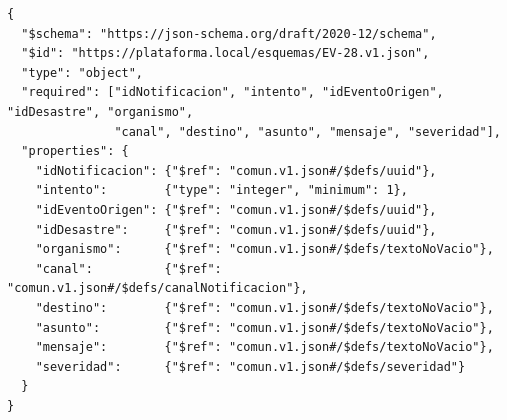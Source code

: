 \documentclass[11pt,letterpaper]{article}
\begin{document}
\begingroup\footnotesize
\begin{verbatim}
{
  "$schema": "https://json-schema.org/draft/2020-12/schema",
  "$id": "https://plataforma.local/esquemas/EV-28.v1.json",
  "type": "object",
  "required": ["idNotificacion", "intento", "idEventoOrigen", "idDesastre", "organismo",
               "canal", "destino", "asunto", "mensaje", "severidad"],
  "properties": {
    "idNotificacion": {"$ref": "comun.v1.json#/$defs/uuid"},
    "intento":        {"type": "integer", "minimum": 1},
    "idEventoOrigen": {"$ref": "comun.v1.json#/$defs/uuid"},
    "idDesastre":     {"$ref": "comun.v1.json#/$defs/uuid"},
    "organismo":      {"$ref": "comun.v1.json#/$defs/textoNoVacio"},
    "canal":          {"$ref": "comun.v1.json#/$defs/canalNotificacion"},
    "destino":        {"$ref": "comun.v1.json#/$defs/textoNoVacio"},
    "asunto":         {"$ref": "comun.v1.json#/$defs/textoNoVacio"},
    "mensaje":        {"$ref": "comun.v1.json#/$defs/textoNoVacio"},
    "severidad":      {"$ref": "comun.v1.json#/$defs/severidad"}
  }
}
\end{verbatim}
\endgroup
\end{document}
